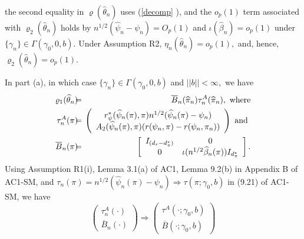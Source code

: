 \documentclass[12pt,thmsb,titlepage,final,oneside,letterpaper]{article}
\begin{document}
the second equality in $\varrho (\widehat{\theta }_{n})$ uses (\ref{decomp}%
), and the $o_{p}\left( 1\right) $ term associated with $\varrho _{2}(%
\widehat{\theta }_{n})$ holds by $n^{1/2}(\widehat{\psi }_{n}-\psi
_{n})=O_{p}(1)$ and $\iota (\widehat{\beta }_{n})=o_{p}(1)$ under $\{\gamma
_{n}\}\in \Gamma (\gamma _{0},0,b).$ Under Assumption R2, $\eta _{n}(%
\widehat{\theta }_{n})=o_{p}\left( 1\right) ,$ and, hence, $\varrho _{2}(%
\widehat{\theta }_{n})=o_{p}\left( 1\right) .$

In part (a), in which case $\{\gamma _{n}\}\in \Gamma (\gamma _{0},0,b)$ and 
$||b||<\infty ,$ we have%
\begin{eqnarray}
\varrho _{1}(\widehat{\theta }_{n})\hspace{-0.08in} &=&\hspace{-0.08in}%
\overline{B}_{n}(\widehat{\pi }_{n})\tau _{n}^{A}(\widehat{\pi }_{n}),\text{
where}  \notag \\
\tau _{n}^{A}(\pi )\hspace{-0.08in} &=&\hspace{-0.08in}\left( 
\begin{array}{c}
r_{\psi }^{\ast }(\widehat{\psi }_{n}(\pi ),\pi )n^{1/2}(\widehat{\psi }%
_{n}(\pi )-\psi _{n}) \\ 
A_{2}(\widehat{\psi }_{n}(\pi ),\pi )(r(\psi _{n},\pi )-r(\psi _{n},\pi
_{n}))%
\end{array}%
\right) \text{ and }  \notag \\
\overline{B}_{n}(\pi )\hspace{-0.08in} &=&\hspace{-0.08in}\left[ 
\begin{array}{cc}
I_{(d_{r}-d_{\pi }^{\ast })} & 0 \\ 
0 & \iota (n^{1/2}\widehat{\beta }_{n}(\pi ))I_{d_{\pi }^{\ast }}%
\end{array}%
\right] .  \label{Varrho 1}
\end{eqnarray}%
Using Assumption R1(i), Lemma 3.1(a) of AC1, Lemma 9.2(b) in Appendix B of
AC1-SM, and $\tau _{n}(\pi )=n^{1/2}(\widehat{\psi }_{n}(\pi )-\psi
_{n})\Rightarrow \tau (\pi ;\gamma _{0},b)$ in (9.21) of AC1-SM, we have%
\begin{equation}
\left( 
\begin{array}{c}
\tau _{n}^{A}(\cdot ) \\ 
\overline{B}_{n}(\cdot )%
\end{array}%
\right) \Rightarrow \left( 
\begin{array}{c}
\tau ^{A}(\cdot ;\gamma _{0},b) \\ 
\overline{B}(\cdot ;\gamma _{0},b)%
\end{array}%
\right)  \label{tao_A and B_bar}
\end{equation}%
\end{document}
